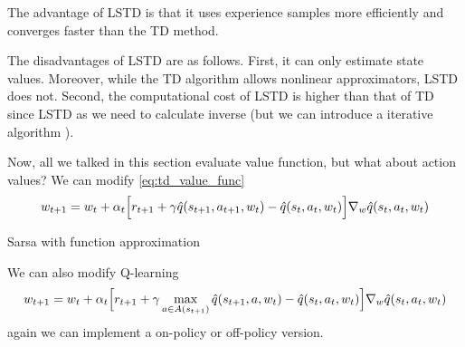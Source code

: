 \documentclass[10pt]{elegantbook}
\begin{document}
The advantage of LSTD is that it uses experience samples more efficiently and converges faster than the TD method. 

The disadvantages of LSTD are as follows. First, it can only estimate state values. Moreover, while the TD algorithm allows nonlinear approximators, LSTD
does not. Second, the computational cost of LSTD is higher than that of TD since LSTD as we need to calculate inverse (but we can introduce a iterative algorithm
).

Now, all we talked in this section evaluate value function, but what about action values? We can modify \ref{eq:td_value_func}
\begin{equation} \label{eq:td_action_func}
    w_{t+1}=w_{t}+\alpha_{t}\Bigl[r_{t+1}+\gamma\hat{q}(s_{t+1},a_{t+1},w_{t})-\hat{q}(s_{t},a_{t},w_{t})\Bigr]\nabla_{w}\hat{q}(s_{t},a_{t},w_{t})
\end{equation}

\vspace{\baselineskip}

\begin{algorithm}[H]
\caption{Sarsa with function approximation}

\end{algorithm}

\vspace{\baselineskip}

We can also modify Q-learning
\begin{equation}  \label{eq:td_action_func_q}
    w_{t+1}=w_{t}+\alpha_{t}\Bigl[r_{t+1}+\gamma\operatorname*{max}_{a\in A(s_{t+1})}\hat{q}(s_{t+1},a,w_{t})
    -\hat{q}(s_{t},a_{t},w_{t})\Bigr]\nabla_{w}\hat{q}(s_{t},a_{t},w_{t})
\end{equation}
again we can implement a on-policy or off-policy version.
\end{document}

